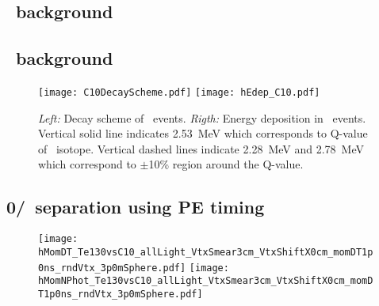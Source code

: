 \subsection{\B~background}



\subsection{\C~background}


\begin{figure}[ht]
  \centering
  \texttt{[image: C10DecayScheme.pdf]}
  \texttt{[image: hEdep\_C10.pdf]}
  \caption{\emph{Left:} Decay scheme of \C~events. \emph{Rigth:} Energy deposition in \C~events. Vertical solid line indicates 2.53~MeV
    which corresponds to Q-value of \Te~isotope. Vertical dashed lines indicate 2.28~MeV and 2.78~MeV which correspond to $\pm$10\% region 
    around the Q-value.}
\label{fig:C10_scheme_and_edep}
\end{figure}




\subsection{0\nbb/\C~separation using PE timing}
\begin{figure}[h]
  \centering
  \texttt{[image: hMomDT\_Te130vsC10\_allLight\_VtxSmear3cm\_VtxShiftX0cm\_momDT1p0ns\_rndVtx\_3p0mSphere.pdf]}
  \texttt{[image: hMomNPhot\_Te130vsC10\_allLight\_VtxSmear3cm\_VtxShiftX0cm\_momDT1p0ns\_rndVtx\_3p0mSphere.pdf]}
  \caption{}
\label{fig:0nbb-C10_timing_separation}
\end{figure}

